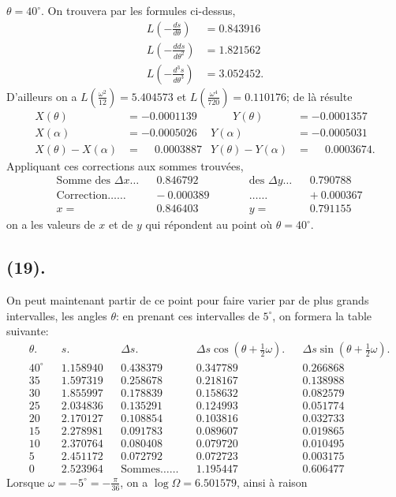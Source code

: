\documentclass{article}
\begin{document}
$\theta=40^{\circ}$. On trouvera par les formules ci-dessus,
\[ \begin{aligned} L\left(-\frac{ds}{d\theta}\right)&=0.843916\\ L\left(-\frac{dds}{d\theta^{2}}\right)&=1.821562\\ L\left(-\frac{d^{3}s}{d\theta^{3}}\right)&=3.052452. \end{aligned} \]
D'ailleurs on a $L\left(\frac{\omega^{2}}{12}\right)=5.404573$ et $L\left(\frac{\omega^{4}}{720}\right)=0.110176$; de là résulte
\[ \begin{aligned} X(\theta)&=-0.0001139 &\qquad Y(\theta)&=-0.0001357\\ X(\alpha)&=-0.0005026 & Y(\alpha)&=-0.0005031\\ X(\theta)-X(\alpha)&=\phantom{-}0.0003887 & Y(\theta)-Y(\alpha)&=\phantom{-}0.0003674. \end{aligned} \]
Appliquant ces corrections aux sommes trouvées,
\[ \begin{aligned} &\text{Somme des }\Delta x\ldots && 0.846792 &\qquad& \text{des }\Delta y\ldots && 0.790788\\ &\text{Correction}\ldots\ldots && -\ 0.000389 && \ldots\ldots && +\ 0.000367\\ &x= && 0.846403 && y= && 0.791155 \end{aligned} \]
on a les valeurs de $x$ et de $y$ qui répondent au point où $\theta=40^{\circ}$.

\subsection*{(19).}

On peut maintenant partir de ce point pour faire varier par de plus grands intervalles, les angles $\theta$: en prenant ces intervalles de $5^{\circ}$, on formera la table suivante:
\[ \begin{aligned} &\theta. && s. && \Delta s. && \Delta s\cos(\theta+\tfrac{1}{2}\omega). && \Delta s\sin(\theta+\tfrac{1}{2}\omega).\\ &40^{\circ} && 1.158940 && 0.438379 && 0.347789 && 0.266868\\ &35 && 1.597319 && 0.258678 && 0.218167 && 0.138988\\ &30 && 1.855997 && 0.178839 && 0.158632 && 0.082579\\ &25 && 2.034836 && 0.135291 && 0.124993 && 0.051774\\ &20 && 2.170127 && 0.108854 && 0.103816 && 0.032733\\ &15 && 2.278981 && 0.091783 && 0.089607 && 0.019865\\ &10 && 2.370764 && 0.080408 && 0.079720 && 0.010495\\ &5 && 2.451172 && 0.072792 && 0.072723 && 0.003175\\ &0 && 2.523964 && \text{Sommes}\ldots\ldots && 1.195447 && 0.606477 \end{aligned} \]
Lorsque $\omega=-5^{\circ}=-\frac{\pi}{36}$, on a $\log\Omega=6.501579$, ainsi à raison
\end{document}
